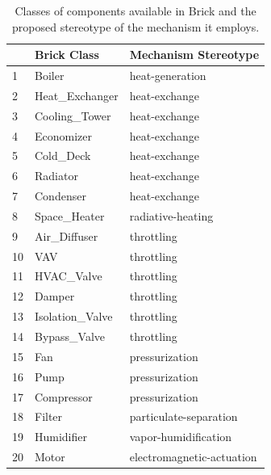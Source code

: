 \documentclass[sigconf]{acmart}
\begin{document}

\begin{table}[ht]
\small
\begin{tabular}{|l|l|l|}
\hline
   & \textbf{Brick Class} & \textbf{Mechanism Stereotype} \\ \hline
1  & Boiler               & heat-generation  \\ \hline
2 & Heat\_Exchanger      & heat-exchange     \\ \hline
3  & Cooling\_Tower       & heat-exchange    \\ \hline
4  & Economizer           & heat-exchange    \\ \hline
5  & Cold\_Deck           & heat-exchange   \\ \hline
6 & Radiator             & heat-exchange     \\ \hline
7  & Condenser            & heat-exchange    \\ \hline
8 & Space\_Heater        & radiative-heating \\ \hline
9 & Air\_Diffuser        & throttling        \\ \hline
10 & VAV                  & throttling       \\ \hline
11  & HVAC\_Valve          & throttling                      \\ \hline
12  & Damper               & throttling                      \\ \hline
13 & Isolation\_Valve     & throttling                      \\ \hline
14  & Bypass\_Valve        & throttling                      \\ \hline
15 & Fan                  & pressurization           \\ \hline
16 & Pump                 & pressurization           \\ \hline
17  & Compressor           & pressurization           \\ \hline
18 & Filter               & particulate-separation         \\ \hline
19 & Humidifier           & vapor-humidification            \\ \hline
20 & Motor                & electromagnetic-actuation     \\ \hline
\end{tabular}
\caption{Classes of components available in Brick and the proposed stereotype of the mechanism it employs.}
\label{tab:brick-mapping}
\vspace{-4mm}
\end{table}
\end{document}
